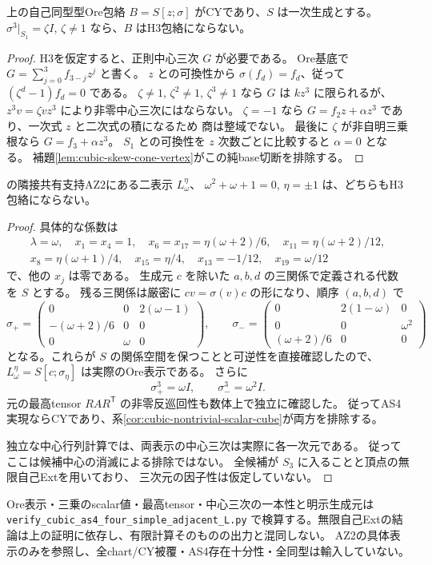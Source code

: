 \begin{corollary}\label{cor:cubic-nontrivial-scalar-cube}
上の自己同型型Ore包絡 $B=S[z;\sigma]$ がCYであり、$S$ は一次生成とする。
$\sigma^3|_{S_1}=\zeta I$, $\zeta\ne1$ なら、$B$ はH3包絡にならない。
\end{corollary}
\begin{proof}
H3を仮定すると、正則中心三次 $G$ が必要である。
Ore基底で $G=\sum_{j=0}^3 f_{3-j}z^j$ と書く。
$z$ との可換性から $\sigma(f_d)=f_d$、従って
$(\zeta^d-1)f_d=0$ である。
$\zeta\ne1$, $\zeta^2\ne1$, $\zeta^3\ne1$ なら $G$ は $kz^3$ に限られるが、
$z^3v=\zeta vz^3$ により非零中心三次にはならない。
$\zeta=-1$ なら $G=f_2z+\alpha z^3$ であり、一次式 $z$ と二次式の積になるため
商は整域でない。
最後に $\zeta$ が非自明三乗根なら $G=f_3+\alpha z^3$。
$S_1$ との可換性を $z$ 次数ごとに比較すると $\alpha=0$ となる。
補題\ref{lem:cubic-skew-cone-vertex}がこの純base切断を排除する。
\end{proof}

\begin{proposition}\label{prop:cubic-adjacent-L}
\cite{AS4lowpinned}の隣接共有支持AZ2にある二表示 $L^\eta_\omega$、
$\omega^2+\omega+1=0$, $\eta=\pm1$ は、どちらもH3包絡にならない。
\end{proposition}
\begin{proof}
具体的な係数は
\[
\begin{gathered}
 \lambda=\omega,\quad x_1=x_4=1,\quad
 x_6=x_{17}=\eta(\omega+2)/6,\quad x_{11}=\eta(\omega+2)/12,\\
 x_8=\eta(\omega+1)/4,\quad x_{15}=\eta/4,\quad
 x_{13}=-1/12,\quad x_{19}=\omega/12
\end{gathered}
\]
で、他の $x_j$ は零である。
生成元 $c$ を除いた $a,b,d$ の三関係で定義される代数を $S$ とする。
残る三関係は厳密に $cv=\sigma(v)c$ の形になり、順序 $(a,b,d)$ で
\[
 \sigma_+=\begin{pmatrix}
 0&0&2(\omega-1)\\-(\omega+2)/6&0&0\\0&\omega&0
 \end{pmatrix},\qquad
 \sigma_-=\begin{pmatrix}
 0&2(1-\omega)&0\\0&0&\omega^2\\(\omega+2)/6&0&0
 \end{pmatrix}
\]
となる。これらが $S$ の関係空間を保つことと可逆性を直接確認したので、
$L^\eta_\omega=S[c;\sigma_\eta]$ は実際のOre表示である。
さらに
\[
 \sigma_+^3=\omega I,\qquad \sigma_-^3=\omega^2I.
\]
元の最高tensor $R A R^{\mathsf T}$ の非零反巡回性も数体上で独立に確認した。
従ってAS4実現ならCYであり、系\ref{cor:cubic-nontrivial-scalar-cube}が両方を排除する。

独立な中心行列計算では、両表示の中心三次は実際に各一次元である。
従ってここは候補中心の消滅による排除ではない。
全候補が $S_3$ に入ることと頂点の無限自己Extを用いており、
三次元の因子性は仮定していない。
\end{proof}

Ore表示・三乗のscalar値・最高tensor・中心三次の一本性と明示生成元は
\texttt{verify\_\allowbreak{}cubic\_\allowbreak{}as4\_\allowbreak{}four\_\allowbreak{}simple\_\allowbreak{}adjacent\_\allowbreak{}L.py}
で検算する。無限自己Extの結論は上の証明に依存し、有限計算そのものの出力と混同しない。
AZ2の具体表示のみを参照し、全chart/CY被覆・AS4存在十分性・全同型は輸入していない。
